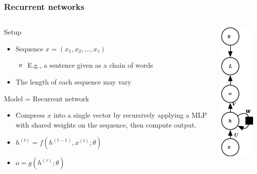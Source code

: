 \documentclass{beamer}
\begin{document}
\begin{frame}
    \frametitle{Recurrent networks}

    \begin{columns}
        \begin{column}{0.75\textwidth}
            Setup
            \begin{itemize}
                \item {\color{blue} Sequence} $x = (x_1, x_2, ..., x_{\tau})$
                \begin{itemize}
                    \item E.g., a sentence given as a chain of words
                \end{itemize}
                \item The length of each sequence may vary
            \end{itemize}

            \vspace{0.5cm}

            Model = Recurrent network
            \begin{itemize}
                \item Compress $x$ into a single vector by recursively applying a MLP with shared weights on the sequence, then compute output.
                \item $h^{(t)} = f(h^{(t-1)}, x^{(t)}; \theta) $
                \item $o = g(h^{(\tau)}; \theta)$
            \end{itemize}
        \end{column}
        \begin{column}{0.2\textwidth}
            \centering
            \includegraphics[scale=0.3]{figures/rnn1.png}
        \end{column}
    \end{columns}



\end{frame}
\end{document}
